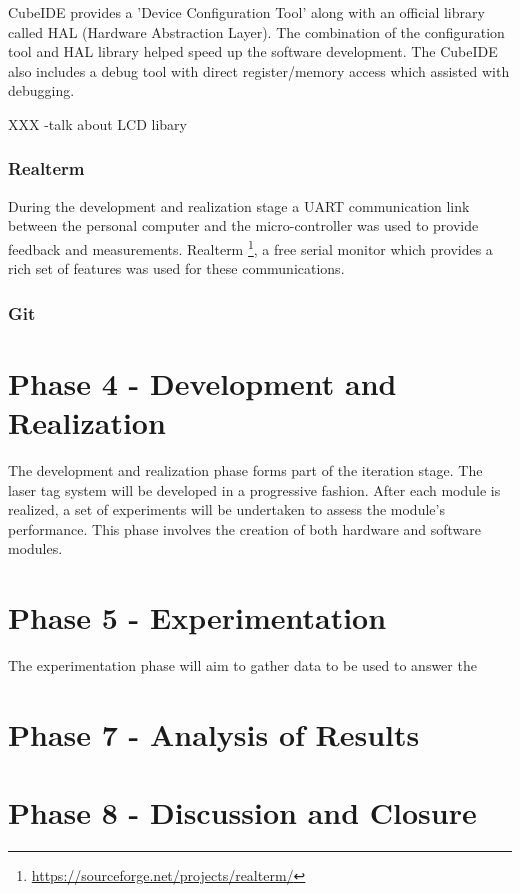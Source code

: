 CubeIDE provides a 'Device Configuration Tool' along with an official library called HAL (Hardware Abstraction Layer). The combination of the configuration tool and HAL library helped speed up the software development. The CubeIDE also includes a debug tool with direct register/memory access which assisted with debugging.

XXX -talk about LCD libary

\subsubsection{Realterm}
During the development and realization stage a UART communication link between the personal computer and the micro-controller was used to provide feedback and measurements. Realterm \footnote{\url{https://sourceforge.net/projects/realterm/}}, a free serial monitor which provides a rich set of features was used for these communications.

\subsubsection{Git}




\section{Phase 4 - Development and Realization}

The development and realization phase forms part of the iteration stage. The laser tag system will be developed in a progressive fashion. After each module is realized, a set of experiments will be undertaken to assess the module's performance. This phase involves the creation of both hardware and software modules.

\section{Phase 5 - Experimentation}

The experimentation phase will aim to gather data to be used to answer the 



\section{Phase 7 - Analysis of Results}



\section{Phase 8 - Discussion and Closure}








